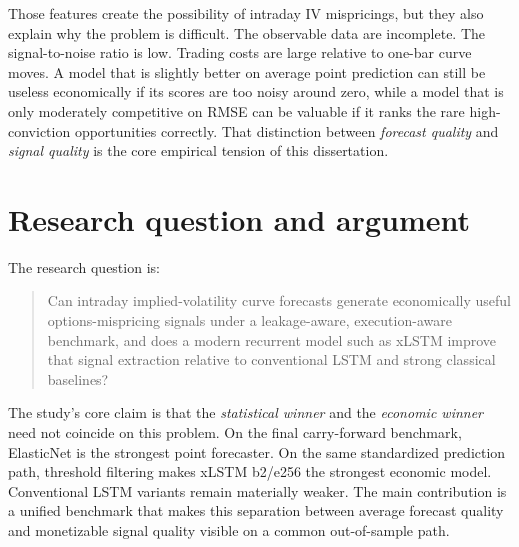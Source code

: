\documentclass[12pt]{report}
\begin{document}
Those features create the possibility of intraday IV mispricings, but they also explain why the problem is difficult. The observable data are incomplete. The signal-to-noise ratio is low. Trading costs are large relative to one-bar curve moves. A model that is slightly better on average point prediction can still be useless economically if its scores are too noisy around zero, while a model that is only moderately competitive on RMSE can be valuable if it ranks the rare high-conviction opportunities correctly. That distinction between \emph{forecast quality} and \emph{signal quality} is the core empirical tension of this dissertation.

\section{Research question and argument}
The research question is:

\begin{quote}
Can intraday implied-volatility curve forecasts generate economically useful options-mispricing signals under a leakage-aware, execution-aware benchmark, and does a modern recurrent model such as xLSTM improve that signal extraction relative to conventional LSTM and strong classical baselines?
\end{quote}

The study's core claim is that the \emph{statistical winner} and the \emph{economic winner} need not coincide on this problem. On the final carry-forward benchmark, ElasticNet is the strongest point forecaster. On the same standardized prediction path, threshold filtering makes xLSTM b2/e256 the strongest economic model. Conventional LSTM variants remain materially weaker. The main contribution is a unified benchmark that makes this separation between average forecast quality and monetizable signal quality visible on a common out-of-sample path.
\end{document}
